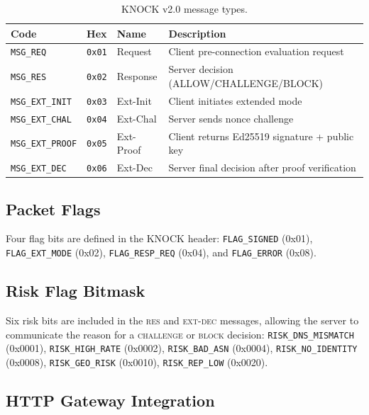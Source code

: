 \documentclass[10pt,conference]{IEEEtran}
\begin{document}
\begin{table}[h]
  \centering
  \caption{KNOCK v2.0 message types.}
  \label{tab:messages}
  \footnotesize
  \begin{tabular}{@{}lllp{3.8cm}@{}}
    \toprule
    \textbf{Code} & \textbf{Hex} & \textbf{Name} & \textbf{Description} \\
    \midrule
    \texttt{MSG\_REQ}       & \texttt{0x01} & Request  & Client pre-connection evaluation request \\
    \texttt{MSG\_RES}       & \texttt{0x02} & Response & Server decision (ALLOW/CHALLENGE/BLOCK) \\
    \texttt{MSG\_EXT\_INIT} & \texttt{0x03} & Ext-Init & Client initiates extended mode \\
    \texttt{MSG\_EXT\_CHAL} & \texttt{0x04} & Ext-Chal & Server sends nonce challenge \\
    \texttt{MSG\_EXT\_PROOF}& \texttt{0x05} & Ext-Proof& Client returns Ed25519 signature + public key \\
    \texttt{MSG\_EXT\_DEC}  & \texttt{0x06} & Ext-Dec  & Server final decision after proof verification \\
    \bottomrule
  \end{tabular}
\end{table}

\subsection{Packet Flags}

Four flag bits are defined in the KNOCK header:
\texttt{FLAG\_SIGNED} (0x01), \texttt{FLAG\_EXT\_MODE} (0x02),
\texttt{FLAG\_RESP\_REQ} (0x04), and \texttt{FLAG\_ERROR} (0x08).

\subsection{Risk Flag Bitmask}

Six risk bits are included in the \textsc{res} and \textsc{ext-dec}
messages, allowing the server to communicate the reason for a
\textsc{challenge} or \textsc{block} decision:
\texttt{RISK\_DNS\_MISMATCH} (0x0001),
\texttt{RISK\_HIGH\_RATE} (0x0002),
\texttt{RISK\_BAD\_ASN} (0x0004),
\texttt{RISK\_NO\_IDENTITY} (0x0008),
\texttt{RISK\_GEO\_RISK} (0x0010),
\texttt{RISK\_REP\_LOW} (0x0020).

\subsection{HTTP Gateway Integration}
\end{document}
